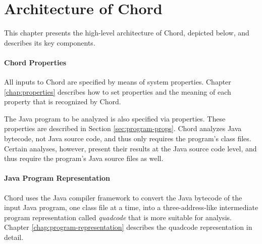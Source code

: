 \chapter{Architecture of Chord}
\label{chap:architecture}

This chapter presents the high-level architecture of Chord, depicted below, and describes its key components.

\begin{center}
\end{center}

\subsubsection*{Chord Properties}

All inputs to Chord are specified by means of system properties. 
Chapter \ref{chap:properties} describes how to set properties and the meaning of 
each property that is recognized by Chord.

The Java program to be analyzed is also specified via properties.
These properties are described in Section \ref{sec:program-props}.
Chord analyzes Java bytecode, not Java source code, and thus only requires
the program's class files.  Certain analyses, however, present
their results at the Java source code level, and thus require the program's
Java source files as well.

\subsubsection*{Java Program Representation}

Chord uses the  Java compiler framework
to convert the Java bytecode of the input Java program, one class file at a time,
into a three-address-like intermediate program representation called {\it quadcode}
that is more suitable for analysis. Chapter \ref{chap:program-representation}
describes the quadcode representation in detail.

